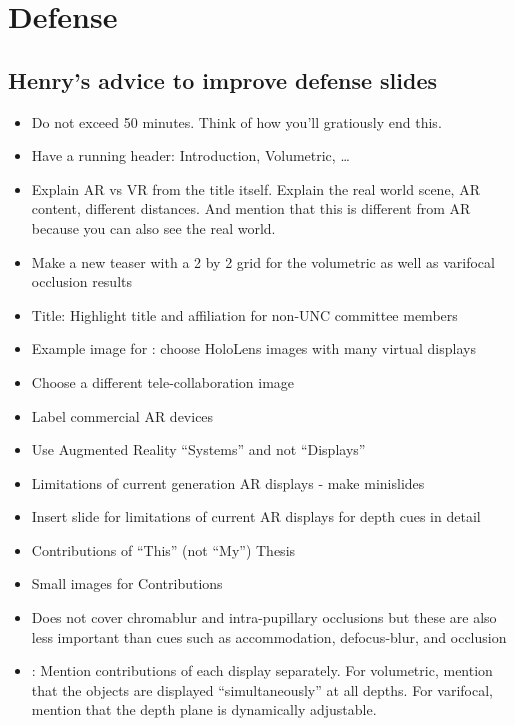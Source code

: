 \chapter{Defense}
\section{Henry's advice to improve defense slides}
\begin{itemize}
\item Do not exceed 50 minutes. Think of how you'll gratiously end this.
\item Have a running header: Introduction, Volumetric, \dots
\item Explain AR vs VR from the title itself. Explain the real world scene, AR content, different distances. And mention that this is different from AR because you can also see the real world. 
\item Make a new teaser with a 2 by 2 grid for the volumetric as well as varifocal occlusion results
\item Title: Highlight title and affiliation for non-UNC committee members
\item Example image for : choose HoloLens images with many virtual displays
\item Choose a different tele-collaboration image
\item Label commercial AR devices
\item Use Augmented Reality ``Systems'' and not ``Displays''
\item Limitations of current generation AR displays - make minislides
\item Insert slide for limitations of current AR displays for depth cues in detail
\item Contributions of ``This'' (not ``My'') Thesis
\item Small images for Contributions
\item Does not cover chromablur and intra-pupillary occlusions but these are also less important than cues such as accommodation, defocus-blur, and occlusion
\item {}: Mention contributions of each display separately. For volumetric, mention that the objects are displayed ``simultaneously'' at all depths. For varifocal, mention that the depth plane is dynamically adjustable.

\end{itemize}
